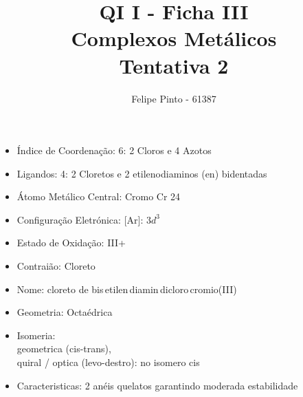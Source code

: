 \documentclass[12pt]{article}
\begin{document}
\title{ \bfseries\color{DarkGreen!75}
	  QI I 
	- Ficha III
	\\Complexos Metálicos
	\\Tentativa 2
}
\author{Felipe Pinto - 61387}

\maketitle
\tableofcontents
\break

\section{}


	\subsection{}
	\begin{itemize}
   
   \item Índice de Coordenação: 6: 2 Cloros e 4 Azotos
   
   \item Ligandos: 4:
   	2 Cloretos 
	 	e 2 etilenodiaminos (en) bidentadas
   	
   
   \item Átomo Metálico Central: Cromo Cr 24
   
   \item Configuração Eletrónica:
   	[Ar]: $ 3d^3 $
   
   \item Estado de Oxidação: III+
   
   \item Contraião: Cloreto 
   
   \item Nome: 
   	cloreto de bis\,etilen\,diamin\,dicloro\,cromio(III)
   
   \item Geometria: Octaédrica
   
   \item Isomeria:\\
   	geometrica (cis-trans),\\
		quiral / optica (levo-destro): no isomero cis

	\item Caracteristicas: 
		2 anéis quelatos garantindo moderada estabilidade

	\end{itemize}
\end{document}
